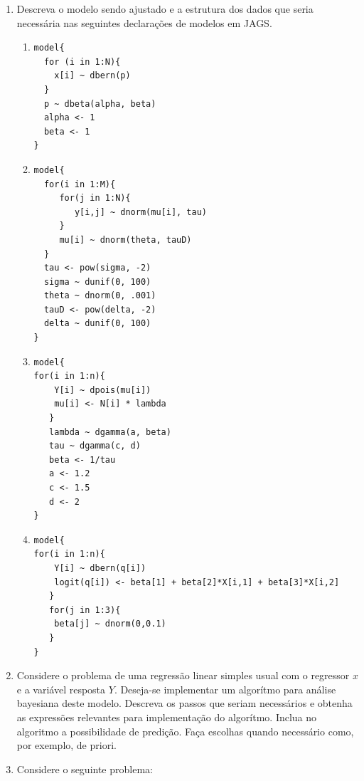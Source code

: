 \documentclass[11pt,a4]{article}\usepackage[]{graphicx}\usepackage[]{xcolor}
\begin{document}
\begin{enumerate}
\item Descreva o modelo sendo ajustado e a estrutura dos dados que seria necessária nas seguintes declarações de modelos em JAGS.

\begin{enumerate}

\item 
\begin{verbatim}
model{
  for (i in 1:N){
    x[i] ~ dbern(p)
  }
  p ~ dbeta(alpha, beta)
  alpha <- 1
  beta <- 1
}
\end{verbatim}

\item
\begin{verbatim}
model{
  for(i in 1:M){
     for(j in 1:N){
        y[i,j] ~ dnorm(mu[i], tau)
     }
     mu[i] ~ dnorm(theta, tauD)
  }
  tau <- pow(sigma, -2)
  sigma ~ dunif(0, 100)
  theta ~ dnorm(0, .001)
  tauD <- pow(delta, -2)
  delta ~ dunif(0, 100)
}
\end{verbatim}

\item
\begin{verbatim}
model{
for(i in 1:n){
    Y[i] ~ dpois(mu[i])
    mu[i] <- N[i] * lambda
   }
   lambda ~ dgamma(a, beta)
   tau ~ dgamma(c, d)
   beta <- 1/tau
   a <- 1.2
   c <- 1.5
   d <- 2
}
\end{verbatim}

\item
\begin{verbatim}
model{
for(i in 1:n){
    Y[i] ~ dbern(q[i])
    logit(q[i]) <- beta[1] + beta[2]*X[i,1] + beta[3]*X[i,2] 
   }
   for(j in 1:3){
    beta[j] ~ dnorm(0,0.1)
   }
}
\end{verbatim}

\end{enumerate} 



\item Considere o problema de uma regressão linear simples usual com o regressor $x$ e a variável resposta $Y$.
Deseja-se implementar um algorítmo para análise bayesiana deste modelo.
Descreva os passos que seriam necessários e
obtenha as expressões relevantes para implementação do algorítmo. 
Inclua no algoritmo a possibilidade de predição.
Faça escolhas quando necessário como, por exemplo, de priori.

\item Considere o seguinte problema: \\

\end{enumerate}
\end{document}
